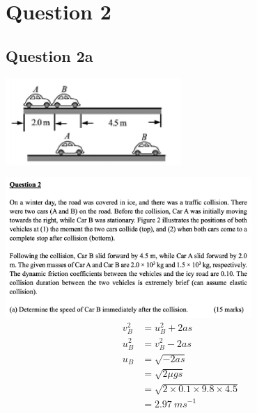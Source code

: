 \documentclass{article}
\begin{document}
\section*{Question 2}
\subsection*{Question 2a}
\includegraphics[width=0.5\textwidth]{img/A4Fig2.jpg}

\includegraphics[width=0.7\textwidth]{img/A4Q2a.jpg}
\begin{align*}
    v_B^2 & = u_B^2 + 2as                         \\
    u_B^2 & = v_B^2 - 2as                         \\
    u_B   & = \sqrt{-2as}                         \\
          & = \sqrt{2\mu gs}                      \\
          & = \sqrt{2\times0.1\times9.8\times4.5} \\
          & = 2.97\ ms^{-1}                       \\
\end{align*}
\end{document}
